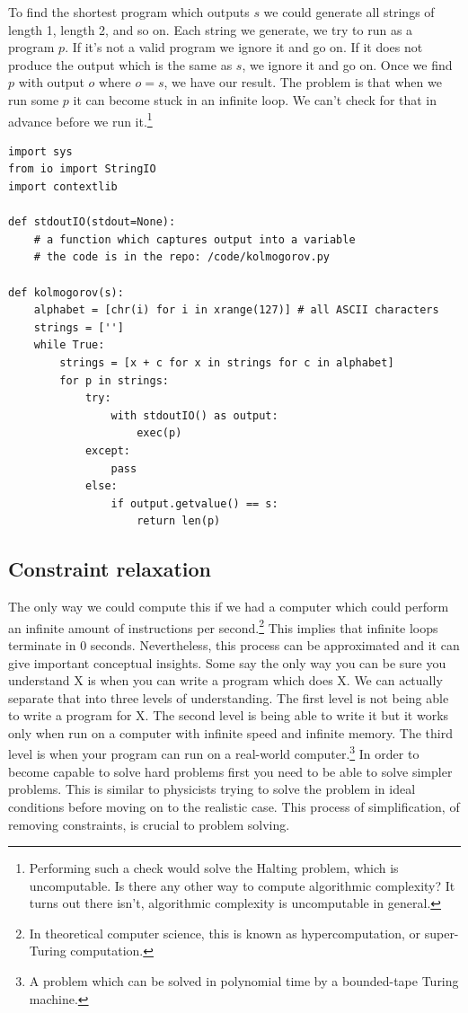\documentclass[oneside,hidelinks]{article}
\begin{document}
To find the shortest program which outputs $s$ we could generate all strings of length 1, length 2, and so on.
Each string we generate, we try to run as a program $p$.
If it's not a valid program we ignore it and go on.
If it does not produce the output which is the same as $s$, we ignore it and go on.
Once we find $p$ with output $o$ where $o = s$, we have our result.
The problem is that when we run some $p$ it can become stuck in an infinite loop.
We can't check for that in advance before we run it.\footnote{
Performing such a check would solve the Halting problem, which is uncomputable.
Is there any other way to compute algorithmic complexity?
It turns out there isn't, algorithmic complexity is uncomputable in general.
}

\newpage

\begin{lstlisting}[caption={Computing the algorithmic complexity of a string. Do not run this at home.}]
import sys
from io import StringIO
import contextlib

def stdoutIO(stdout=None):
	# a function which captures output into a variable
	# the code is in the repo: /code/kolmogorov.py

def kolmogorov(s):
	alphabet = [chr(i) for i in xrange(127)] # all ASCII characters
	strings = ['']
	while True:
		strings = [x + c for x in strings for c in alphabet]
		for p in strings:
			try:
				with stdoutIO() as output:
					exec(p)
			except:
				pass
			else:
				if output.getvalue() == s:
					return len(p)
\end{lstlisting}

\newpage

\subsection{Constraint relaxation}

The only way we could compute this if we had a computer which could perform an infinite amount of instructions per second.\footnote{In theoretical computer science, this is known as hypercomputation, or super-Turing computation.}
This implies that infinite loops terminate in 0 seconds.
Nevertheless, this process can be approximated and it can give important conceptual insights.
Some say the only way you can be sure you understand X is when you can write a program which does X.
We can actually separate that into three levels of understanding.
The first level is not being able to write a program for X.
The second level is being able to write it but it works only when run on a computer with infinite speed and infinite memory.
The third level is when your program can run on a real-world computer.\footnote{A problem which can be solved in polynomial time by a bounded-tape Turing machine.}
In order to become capable to solve hard problems first you need to be able to solve simpler problems.
This is similar to physicists trying to solve the problem in ideal conditions before moving on to the realistic case.
This process of simplification, of removing constraints, is crucial to problem solving.
\end{document}
